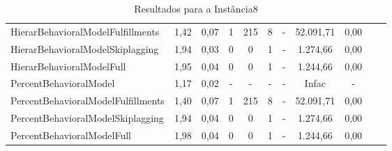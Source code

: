 \begin{table}[h!]
{\begin{tabular}{lcccccccccc}
			HierarBehavioralModelFulfillments  & 1,42   & 0,07 & 1 & 215 & 8 & -          & 52.091,71 & 0,00 \\ 
			HierarBehavioralModelSkiplagging   & 1,94   & 0,03 & 0 & 0   & 1 & -          & 1.274,66  & 0,00 \\ 
			HierarBehavioralModelFull          & 1,95   & 0,04 & 0 & 0   & 1 & -          & 1.244,66  & 0,00 \\ \hline
			PercentBehavioralModel             & 1,17   & 0,02 & - & -   & - & -          & Infac     & -\\ 
			PercentBehavioralModelFulfillments & 1,40   & 0,07 & 1 & 215 & 8 & -          & 52.091,71 & 0,00 \\ 
			PercentBehavioralModelSkiplagging  & 1,94   & 0,04 & 0 & 0   & 1 & -          & 1.274,66  & 0,00 \\ 
			PercentBehavioralModelFull         & 1,98   & 0,04 & 0 & 0   & 1 & -          & 1.244,66  & 0,00 \\ \hline
		\end{tabular}%
	}
	\caption{Resultados para a Instância8}
	\label{tab:resul_instan8}
\end{table}


